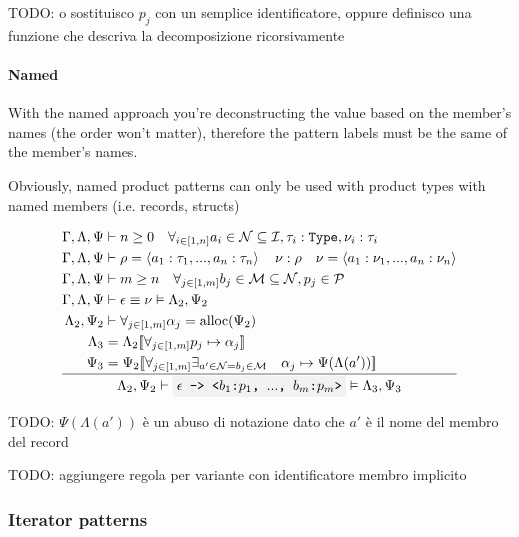 \documentclass[11pt]{report}
\newcommand{\oprule}[3][gathered]{\frac{\begin{#1}#2\end{#1}}{\begin{gathered}#3\end{gathered}}}
\newcommand{\then}{\vdash}
\newcommand{\Then}{\vDash}
\newcommand{\tuple}[1]{\left<#1\right>}
\newcommand{\code}[1]{\texttt{\colorbox{gray!10}{#1}}}
\newcommand{\alloc}{\mathrm{alloc}}
\newcommand{\addr}{\alpha}
\newcommand{\expr}{\epsilon}
\newcommand{\val}{\nu}
\newcommand{\pattern}{p}
\newcommand{\Id}{\mathcal{I}}
\newcommand{\Pattern}{\mathcal{P}}
\newcommand{\Type}{\texttt{Type}}
\newcommand{\env}[1]{[\![#1]\!]}
\newcommand{\Env}{\Gamma}
\newcommand{\EnvLoc}{\Lambda}
\newcommand{\EnvStore}{\Psi}
\theoremstyle{definition}
\newcommand{\comment}[1]{
	\parbox{0.9\linewidth}{\color{black!30}\small\sffamily #1}
}
\begin{document}
\comment{TODO: o sostituisco $\pattern_j$ con un semplice identificatore,
oppure definisco una funzione che descriva la decomposizione ricorsivamente}

\paragraph{Named}

With the named approach you're deconstructing the value based on the member's
names (the order won't matter), therefore the pattern labels must be the same
of the member's names.

Obviously, named product patterns can only be used with product types with
named members (i.e. records, structs)

\[
	\oprule[aligned]{
		\Env,\EnvLoc,\EnvStore  &\then n \geq 0 \quad \forall_{i\in[1,n]}{a_i\in\mathcal{N}\subseteq\Id, \tau_i:\Type, \val_i:\tau_i} \\*
		\Env,\EnvLoc,\EnvStore  &\then \rho = \tuple{a_1:\tau_1,...,a_n:\tau_n} \quad \val:\rho \quad \val = \tuple{a_1:\val_1,...,a_n:\val_n} \\*
		\Env,\EnvLoc,\EnvStore  &\then m \geq n \quad \forall_{j\in[1,m]}{b_j\in\mathcal{M}\subseteq\mathcal{N},\pattern_j\in\Pattern} \\*
		\Env,\EnvLoc,\EnvStore  &\then \expr \equiv \val \Then \EnvLoc_2,\EnvStore_2 \\*
		\EnvLoc_2,\EnvStore_2   &\then \forall_{j\in[1,m]}{\addr_j = \alloc(\EnvStore_2)} \\*
		\EnvLoc_3   &= \EnvLoc_2\env{\forall_{j\in[1,m]}{\pattern_j\mapsto\addr_j}}\\*
		\EnvStore_3 &= \EnvStore_2\env{\forall_{j\in[1,m]}{\exists_{a'\in\mathcal{N}=b_j\in\mathcal{M}}{\quad\addr_j\mapsto\EnvStore(\EnvLoc(a'))}}}\\*
	}{
		\EnvLoc_2,\EnvStore_2 \then \code{$\expr$ -> <$b_1$:$\pattern_1$, $...$, $b_m$:$\pattern_m$>} \Then \EnvLoc_3,\EnvStore_3\\*
	}
\]

\comment{TODO: $\EnvStore(\EnvLoc(a'))$ è un abuso di notazione dato che $a'$ è
il nome del membro del record}

\comment{TODO: aggiungere regola per variante con identificatore membro
implicito}

\subsubsection{Iterator patterns}
\end{document}
